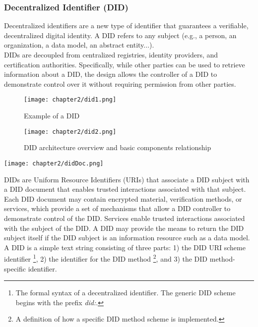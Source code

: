 \subsubsection{Decentralized Identifier (DID)}
Decentralized identifiers are a new type of identifier that guarantees a verifiable, 
decentralized digital identity. A DID refers to any subject (e.g., a person, an 
organization, a data model, an abstract entity...).\\
DIDs are decoupled from centralized registries, identity providers, and certification 
authorities. Specifically, while other parties can be used to retrieve information 
about a DID, the design allows the controller of a DID to demonstrate control over it 
without requiring permission from other parties.
\begin{figure}[!htb]
    \begin{minipage}{0.48\textwidth}
      \centering
      \texttt{[image: chapter2/did1.png]}
      \vspace{1.1cm}
      \caption{Example of a DID}
    \end{minipage}\hfill
    \begin{minipage}{0.48\textwidth}
      \centering
      \texttt{[image: chapter2/did2.png]}
      \caption{DID architecture overview and basic components relationship}
    \end{minipage}
 \end{figure}
\begin{center}
    \vspace{-0.8cm}
    \texttt{[image: chapter2/didDoc.png]}
    \vspace{-0.4cm}
\end{center}
\vspace{0.5cm}
DIDs are Uniform Resource Identifiers (URIs) that associate a DID subject with a DID 
document that enables trusted interactions associated with that subject.
Each DID document may contain encrypted material, verification methods, or services, 
which provide a set of mechanisms that allow a DID controller to demonstrate control 
of the DID. Services enable trusted interactions associated with the subject of the 
DID. A DID may provide the means to return the DID subject itself if the DID subject 
is an information resource such as a data model.\\
A DID is a simple text string consisting of three parts: 1) the DID URI scheme 
identifier \footnote{The formal syntax of a decentralized identifier. The generic 
DID scheme begins with the prefix \textit{did:}.}, 2) the identifier for the DID method
\footnote{A definition of how a specific DID method scheme is implemented.}, and 3) 
the DID method-specific identifier.

